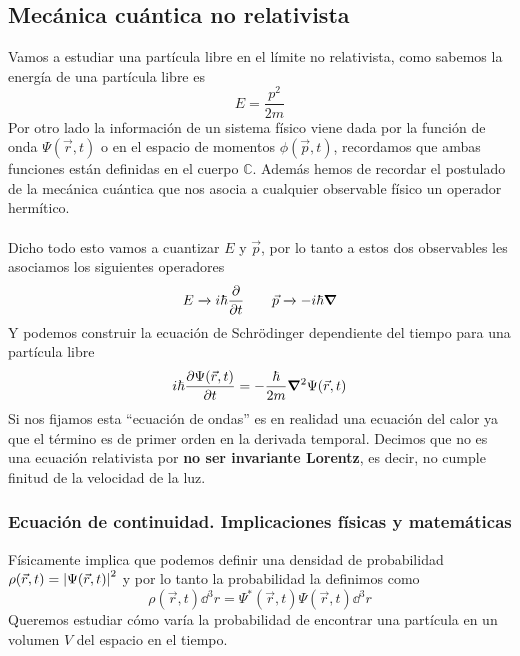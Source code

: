 \subsection{Mecánica cuántica no relativista}
Vamos a estudiar una partícula libre en el límite no relativista, como sabemos la energía de una partícula libre es  
\begin{equation*}
    E=\frac{p^2}{2m}
\end{equation*}
Por otro lado la información de un sistema físico viene dada por la función de onda $\Psi(\vec{r},t)$ o en el espacio de momentos $\phi(\vec{p},t)$, recordamos que ambas funciones están definidas en el cuerpo $\mathds{C}$. Además hemos de recordar el postulado de la mecánica cuántica que nos asocia a cualquier observable físico un operador hermítico.\\\\
Dicho todo esto vamos a cuantizar $E$ y $\vec{p}$, por lo tanto a estos dos observables les asociamos los siguientes operadores
\begin{equation}
    E\xrightarrow[]{} i\hbar\pdv{}{t} \quad \quad \vec{p} \xrightarrow[]{} -i\hbar \grad
    \label{eq: primera cuantizacion}
\end{equation}
Y podemos construir la ecuación de Schrödinger dependiente del tiempo para una partícula libre 
\begin{equation}
    i\hbar\pdv{\Psi(\vec{r},t)}{t}= -\frac{\hbar}{2m}\grad^2\Psi(\vec{r},t)
    \label{eq: Ec Schrodinger}
\end{equation}
Si nos fijamos esta ``ecuación de ondas'' es en realidad una ecuación del calor ya que el término es de primer orden en la derivada temporal. Decimos que no es una ecuación relativista por \textbf{no ser invariante Lorentz}, es decir, no cumple finitud de la velocidad de la luz.
\noindent
\begin{minipage}{0.6\textwidth} %
\subsubsection{Ecuación de continuidad. Implicaciones físicas y matemáticas}
    \noindent Físicamente implica que podemos definir una densidad de probabilidad $\rho(\vec{r},t)=\abs{\Psi(\vec{r},t)}^2$ y por lo tanto la probabilidad la definimos como 
\begin{equation}
    \rho(\vec{r},t)\dd^3 r=\Psi^*(\vec{r},t)\Psi(\vec{r},t) \dd^3 r
\end{equation}
Queremos estudiar cómo varía la probabilidad de encontrar una partícula en un volumen $V$ del espacio en el tiempo.
\end{minipage}
